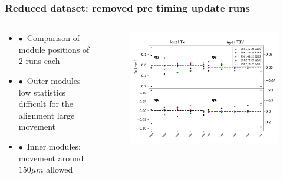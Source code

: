 \documentclass[aspectratio=1610, 12pt, xcolor=dvipsnames]{beamer}
\begin{document}
\begin{frame}\frametitle{Reduced dataset: removed pre timing update runs}
  \begin{columns}
    \begin{column}[c]{0.48\textwidth}
      \begin{itemize}
        \item $\bullet$\, Comparison of module positions of 2 runs each
        \item $\bullet$\, Outer modules \to low statistics \to difficult for the alignment \to large movement
        \item $\bullet$\, Inner modules: movement around $150 \mu m$ allowed
      \end{itemize}
    \end{column}
      \begin{column}[c]{0.48\textwidth}
        \begin{figure}
          \includegraphics[width=\textwidth]{plots/stability_plots/diff_reduced_Tx_T1V_Tx.pdf}
        \end{figure}
      \end{column}
  \end{columns}
\end{frame}
\end{document}
